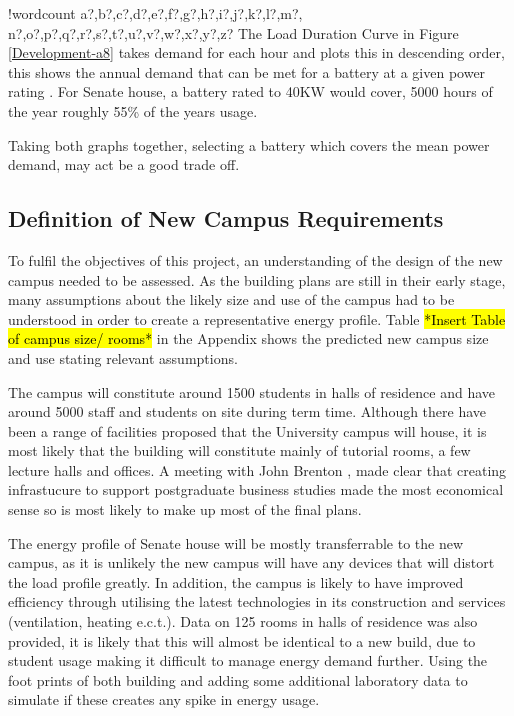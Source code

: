 \documentclass[fontsize=9.5pt]{extarticle}
\numberwithin{figure}{section} %
\newcounter{words}
\newenvironment{counted}{%
  \setcounter{words}{0}
  \SearchList!{wordcount}{\stepcounter{words}}
    {a?,b?,c?,d?,e?,f?,g?,h?,i?,j?,k?,l?,m?,
    n?,o?,p?,q?,r?,s?,t?,u?,v?,w?,x?,y?,z?}
  \UndoBoundary{'}
  \SearchOrder{p;}}{%
  \StopSearching}
\begin{document}
\begin{counted}
The Load Duration Curve in Figure \ref{Development-a8} takes demand for
each hour and plots this in descending order, this shows the annual
demand that can be met for a battery at a given power rating
\autocite{combined-heat-power-buildings}. For Senate house, a battery
rated to 40KW would cover, 5000 hours of the year roughly 55\% of the
years usage.

Taking both graphs together, selecting a battery which covers the mean
power demand, may act be a good trade off.

\subsection{Definition of New Campus
Requirements}\label{definition-of-new-campus-requirements}

To fulfil the objectives of this project, an understanding of the design
of the new campus needed to be assessed. As the building plans are still
in their early stage, many assumptions about the likely size and use of
the campus had to be understood in order to create a representative
energy profile. Table \hl{*Insert Table of campus size/ rooms*} in the
Appendix shows the predicted new campus size and use stating relevant
assumptions.

The campus will constitute around 1500 students in halls of residence
and have around 5000 staff and students on site during term time.
Although there have been a range of facilities proposed that the
University campus will house, it is most likely that the building will
constitute mainly of tutorial rooms, a few lecture halls and offices. A
meeting with John Brenton \autocite{Jbrentmeet}, made clear that
creating infrastucure to support postgraduate business studies made the
most economical sense so is most likely to make up most of the final
plans.

The energy profile of Senate house will be mostly transferrable to the
new campus, as it is unlikely the new campus will have any devices that
will distort the load profile greatly. In addition, the campus is likely
to have improved efficiency through utilising the latest technologies in
its construction and services (ventilation, heating e.c.t.). Data on 125
rooms in halls of residence was also provided, it is likely that this
will almost be identical to a new build, due to student usage making it
difficult to manage energy demand further. Using the foot prints of both
building and adding some additional laboratory data to simulate if these
creates any spike in energy usage.


\end{counted}
\end{document}
